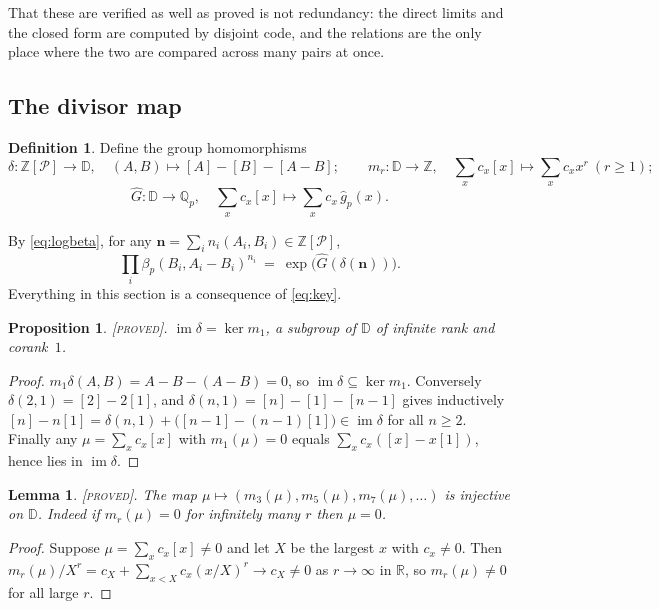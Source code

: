 \documentclass[11pt,reqno]{article}
\newcommand{\Qp}{\mathbb{Q}_p}
\newcommand{\ZZ}{\mathbb{Z}}
\newcommand{\RR}{\mathbb{R}}
\newcommand{\gh}{\widehat{g}_p}
\newcommand{\bet}{\beta_p}
\newcommand{\Pset}{\mathcal{P}}
\newcommand{\Div}{\mathbb{D}}
\DeclareMathOperator{\im}{im}
\newcommand{\PROVED}{{\normalfont\textsc{[proved]}}}
\theoremstyle{plain}
\newtheorem{proposition}[theorem]{Proposition}
\newtheorem{lemma}[theorem]{Lemma}
\theoremstyle{definition}
\newtheorem{definition}[theorem]{Definition}
\theoremstyle{remark}
\numberwithin{equation}{section}
\begin{document}
That these are verified as well as proved is not redundancy: the direct limits
and the closed form are computed by disjoint code, and the relations are the
only place where the two are compared across many pairs at once.

\subsection{The divisor map}

\begin{definition}\label{def:delta}
Define the group homomorphisms
\[
  \delta:\ZZ[\Pset]\longrightarrow\Div,\quad
  (A,B)\longmapsto[A]-[B]-[A-B];
  \qquad
  m_r:\Div\longrightarrow\ZZ,\quad \textstyle\sum_xc_x[x]\longmapsto\sum_xc_xx^r
  \ (r\ge1);
\]
\[
  \widehat{G}:\Div\longrightarrow\Qp,\quad
  \textstyle\sum_xc_x[x]\longmapsto\sum_xc_x\,\gh(x).
\]
\end{definition}

By \eqref{eq:logbeta}, for any $\mathbf n=\sum_in_i(A_i,B_i)\in\ZZ[\Pset]$,
\begin{equation}\label{eq:key}
  \prod_i\bet(B_i,A_i-B_i)^{n_i}\ =\ \exp\bigl(\widehat G(\delta(\mathbf n))\bigr).
\end{equation}
Everything in this section is a consequence of \eqref{eq:key}.

\begin{proposition}\label{prop:image}
\PROVED.  $\im\delta=\ker m_1$, a subgroup of $\Div$ of infinite rank and
corank~$1$.
\end{proposition}

\begin{proof}
$m_1\delta(A,B)=A-B-(A-B)=0$, so $\im\delta\subseteq\ker m_1$.  Conversely
$\delta(2,1)=[2]-2[1]$, and $\delta(n,1)=[n]-[1]-[n-1]$ gives inductively
$[n]-n[1]=\delta(n,1)+\bigl([n-1]-(n-1)[1]\bigr)\in\im\delta$ for all $n\ge2$.
Finally any $\mu=\sum_xc_x[x]$ with $m_1(\mu)=0$ equals
$\sum_xc_x([x]-x[1])$, hence lies in $\im\delta$.
\end{proof}

\begin{lemma}\label{lem:moments}
\PROVED.  The map $\mu\mapsto(m_3(\mu),m_5(\mu),m_7(\mu),\dots)$ is injective on
$\Div$.  Indeed if $m_r(\mu)=0$ for infinitely many $r$ then $\mu=0$.
\end{lemma}

\begin{proof}
Suppose $\mu=\sum_xc_x[x]\ne0$ and let $X$ be the largest $x$ with $c_x\ne0$.
Then $m_r(\mu)/X^r=c_X+\sum_{x<X}c_x(x/X)^r\to c_X\ne0$ as $r\to\infty$ in $\RR$,
so $m_r(\mu)\ne0$ for all large $r$.
\end{proof}
\end{document}
